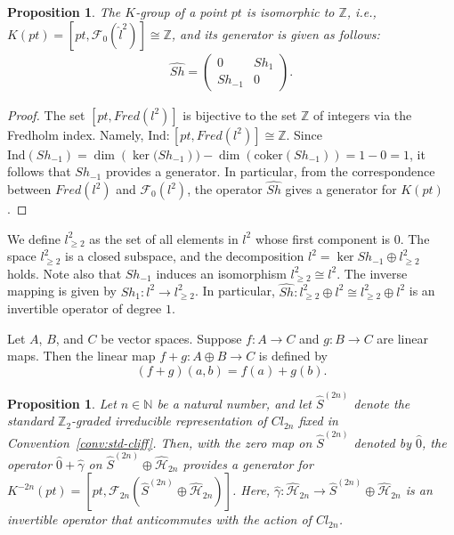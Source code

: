 \documentclass{amsart}
\newtheorem{prop}[thm]{Proposition}
\theoremstyle{definition}
\theoremstyle{remark}
\begin{document}
\begin{prop}\label{Prop:generator on n=0}
The $K$-group of a point $pt$ is isomorphic to $\mathbb{Z}$, i.e., $K(pt)=[pt,\mathcal{F}_0(\hat{l}^2)] \cong \mathbb{Z}$, and its generator is given as follows:
\begin{align*}
\hat{Sh}=
\begin{pmatrix}
0 & Sh_{1} \\
Sh_{-1} & 0
\end{pmatrix}.
\end{align*}
\end{prop}

\begin{proof}
The set $[pt, Fred(l^2)]$ is bijective to the set $\mathbb{Z}$ of integers via the Fredholm index. Namely, $\text{Ind}: [pt, Fred(l^2)] \cong \mathbb{Z}$.
Since $\text{Ind}(Sh_{-1}) = \dim{(\ker{(Sh_{-1}}))} - \dim{(\text{coker}(Sh_{-1}))} = 1 - 0 = 1$, it follows that $Sh_{-1}$ provides a generator. In particular, from the correspondence between $Fred(l^2)$ and $\mathcal{F}_0(l^2)$, the operator $\hat{Sh}$ gives a generator for $K(pt)$.
\end{proof}

We define $l^2_{\ge 2}$ as the set of all elements in $l^2$ whose first component is $0$. The space $l^2_{\ge 2}$ is a closed subspace, and the decomposition $l^2 = \ker{Sh_{-1}} \oplus l^2_{\ge 2}$ holds. Note also that $Sh_{-1}$ induces an isomorphism $l^2_{\ge 2} \cong l^2$. The inverse mapping is given by $Sh_1: l^2 \to l^2_{\ge 2}$. In particular, $\hat{Sh}: l^2_{\ge 2} \oplus l^2 \cong l^2_{\ge 2} \oplus l^2$ is an invertible operator of degree $1$.

Let \( A \), \( B \), and \( C \) be vector spaces. Suppose \( f: A \to C \) and \( g: B \to C \) are linear maps. Then the linear map \( f + g: A \oplus B \to C \) is defined by  
\[
(f + g)(a, b) = f(a) + g(b).
\]

\begin{prop}\label{Prop:generator on pt}
Let $n\in \mathbb{N}$ be a natural number, and let $\hat{S}^{(2n)}$ denote the \emph{standard} $\mathbb{Z}_2$-graded irreducible representation of $Cl_{2n}$ fixed in Convention~\ref{conv:std-cliff}. Then, with the zero map on $\hat{S}^{(2n)}$ denoted by $\hat{0}$, the operator $\hat{0} +  \hat{\gamma}$ on $\hat{S}^{(2n)} \oplus \mathcal{\hat{H}}_{2n}$ provides a generator for $K^{-2n}(pt) = [pt, \mathcal{F}_{2n}(\hat{S}^{(2n)} \oplus \hat{\mathcal{H}}_{2n})]$. Here, $\hat{\gamma}: \mathcal{\hat{H}}_{2n} \to \hat{S}^{(2n)} \oplus \mathcal{\hat{H}}_{2n}$ is an invertible operator that anticommutes with the action of $Cl_{2n}$.
\end{prop}
\end{document}
